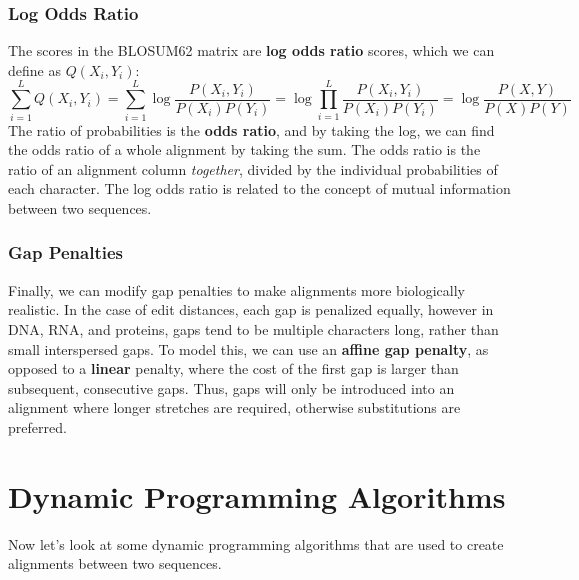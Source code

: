 \documentclass[12pt]{article}
\begin{document}
\subsubsection{Log Odds Ratio}
The scores in the BLOSUM62 matrix are \textbf{log odds ratio} scores, which we can define as $Q(X_i,Y_i)$:
$$\sum_{i=1}^LQ(X_i,Y_i) = \sum_{i=1}^L\log \frac{P\left(X_i,Y_i\right)}{P\left(X_i\right)P\left(Y_i\right)} = \log\prod_{i=1}^L\frac{P\left(X_i,Y_i\right)}{P\left(X_i\right)P\left(Y_i\right)} = \log\frac{P\left(X,Y\right)}{P\left(X\right)P\left(Y\right)}$$
The ratio of probabilities is the \textbf{odds ratio}, and by taking the log, we can find the odds ratio of a whole alignment by taking the sum. The odds ratio is the ratio of an alignment column \textit{together}, divided by the individual probabilities of each character. The log odds ratio is related to the concept of mutual information between two sequences. \\[INSERT SOMETHING ABOUT BAYESIAN INFERENCE HERE?]
\subsubsection{Gap Penalties}
Finally, we can modify gap penalties to make alignments more biologically realistic. In the case of edit distances, each gap is penalized equally, however in DNA, RNA, and proteins, gaps tend to be multiple characters long, rather than small interspersed gaps. To model this, we can use an \textbf{affine gap penalty}, as opposed to a \textbf{linear} penalty, where the cost of the first gap is larger than subsequent, consecutive gaps. Thus, gaps will only be introduced into an alignment where longer stretches are required, otherwise substitutions are preferred.

\section{Dynamic Programming Algorithms}
Now let's look at some dynamic programming algorithms that are used 
to create alignments between two sequences. 
\end{document}
